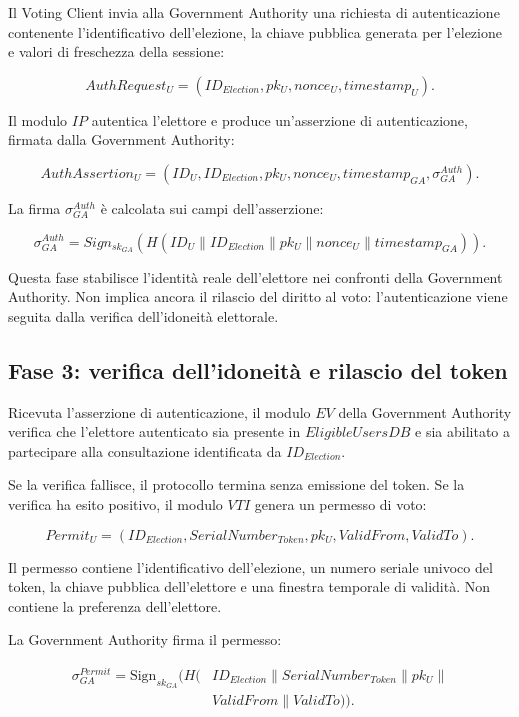 \documentclass[a4paper,12pt]{article}
\begin{document}
Il Voting Client invia alla Government Authority una richiesta di autenticazione contenente l'identificativo dell'elezione, la chiave pubblica generata per l'elezione e valori di freschezza della sessione:

\[
	AuthRequest_U =
	(ID_{Election}, pk_U, nonce_U, timestamp_U).
\]

Il modulo \(IP\) autentica l'elettore e produce un'asserzione di autenticazione, firmata dalla Government Authority:

\[
	AuthAssertion_U =
	(ID_U, ID_{Election}, pk_U, nonce_U, timestamp_{GA}, \sigma_{GA}^{Auth}).
\]

La firma \(\sigma_{GA}^{Auth}\) \`e calcolata sui campi dell'asserzione:

\[
	\sigma_{GA}^{Auth} =
	Sign_{sk_{GA}}(H(ID_U \parallel ID_{Election} \parallel pk_U \parallel nonce_U \parallel timestamp_{GA})).
\]

Questa fase stabilisce l'identit\`a reale dell'elettore nei confronti della Government Authority. 
Non implica ancora il rilascio del diritto al voto: l'autenticazione viene seguita dalla verifica dell'idoneit\`a elettorale.

\subsection{Fase 3: verifica dell'idoneit\`a e rilascio del token}

Ricevuta l'asserzione di autenticazione, il modulo \(EV\) della Government Authority verifica che l'elettore autenticato sia presente in \(EligibleUsersDB\) e sia abilitato a partecipare alla consultazione identificata da \(ID_{Election}\).

Se la verifica fallisce, il protocollo termina senza emissione del token. 
Se la verifica ha esito positivo, il modulo \(VTI\) genera un permesso di voto:

\[
	Permit_U =
	(ID_{Election}, SerialNumber_{Token}, pk_U, ValidFrom, ValidTo).
\]

Il permesso contiene l'identificativo dell'elezione, un numero seriale univoco del token, la chiave pubblica dell'elettore e una finestra temporale di validit\`a. 
Non contiene la preferenza dell'elettore.

La Government Authority firma il permesso:

\begin{equation}
\begin{split}
	\sigma_{GA}^{Permit} = \text{Sign}_{sk_{GA}}\Big(H(&ID_{Election}
	\parallel SerialNumber_{Token} \parallel pk_U \parallel {}\\
	&ValidFrom \parallel ValidTo)\Big).
\end{split}
\end{equation}
\end{document}
